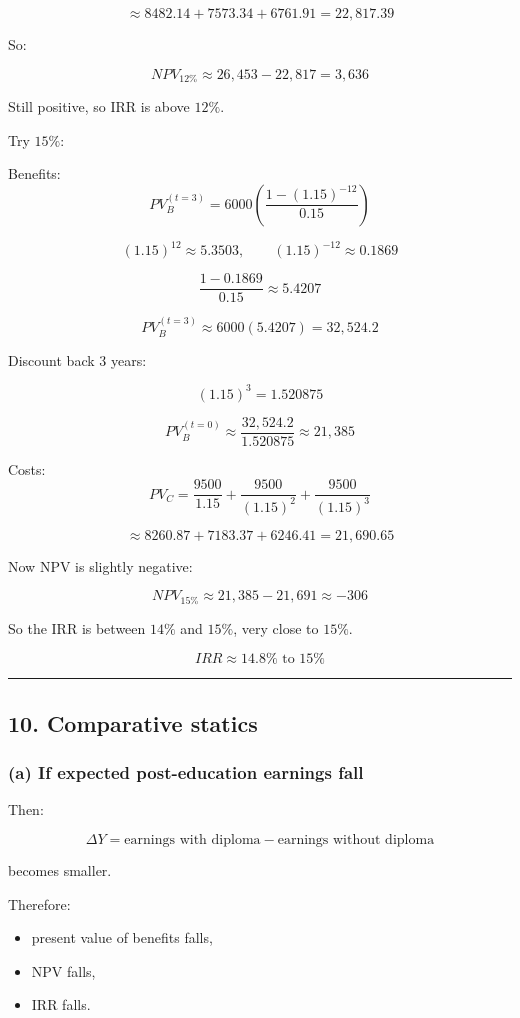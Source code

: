 \documentclass[12pt]{article}
\begin{document}
\[
\approx 8482.14 + 7573.34 + 6761.91 = 22{,}817.39
\]

So:

\[
NPV_{12\%} \approx 26{,}453 - 22{,}817 = 3{,}636
\]

Still positive, so IRR is above \(12\%\).

Try \(15\%\):

Benefits:
\[
PV_B^{(t=3)} = 6000\left(\frac{1-(1.15)^{-12}}{0.15}\right)
\]

\[
(1.15)^{12}\approx 5.3503,\qquad (1.15)^{-12}\approx 0.1869
\]

\[
\frac{1-0.1869}{0.15} \approx 5.4207
\]

\[
PV_B^{(t=3)} \approx 6000(5.4207)=32{,}524.2
\]

Discount back 3 years:

\[
(1.15)^3=1.520875
\]

\[
PV_B^{(t=0)}\approx \frac{32{,}524.2}{1.520875}\approx 21{,}385
\]

Costs:
\[
PV_C=\frac{9500}{1.15}+\frac{9500}{(1.15)^2}+\frac{9500}{(1.15)^3}
\]

\[
\approx 8260.87+7183.37+6246.41=21{,}690.65
\]

Now NPV is slightly negative:

\[
NPV_{15\%}\approx 21{,}385-21{,}691\approx -306
\]

So the IRR is between \(14\%\) and \(15\%\), very close to \(15\%\).

\[
\boxed{IRR \approx 14.8\% \text{ to } 15\%}
\]

\hrule
\vspace{0.5em}

\subsection*{10. Comparative statics}

\subsubsection*{(a) If expected post-education earnings fall}

Then:

\[
\Delta Y = \text{earnings with diploma} - \text{earnings without diploma}
\]

becomes smaller.

Therefore:
\begin{itemize}
    \item present value of benefits falls,
    \item NPV falls,
    \item IRR falls.
\end{itemize}
\end{document}
